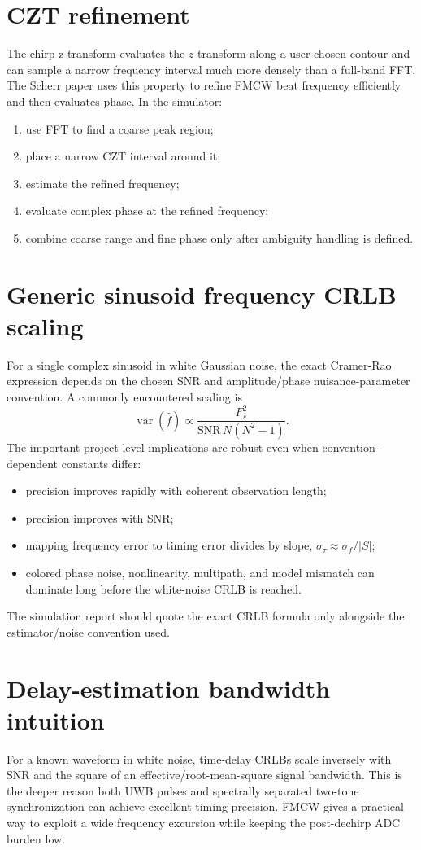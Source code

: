 \documentclass[11pt]{article}
\begin{document}
\section{CZT refinement}
The chirp-z transform evaluates the $z$-transform along a user-chosen contour and can sample a narrow frequency interval much more densely than a full-band FFT. The Scherr paper uses this property to refine FMCW beat frequency efficiently and then evaluates phase. In the simulator:
\begin{enumerate}
\item use FFT to find a coarse peak region;
\item place a narrow CZT interval around it;
\item estimate the refined frequency;
\item evaluate complex phase at the refined frequency;
\item combine coarse range and fine phase only after ambiguity handling is defined.
\end{enumerate}

\section{Generic sinusoid frequency CRLB scaling}
For a single complex sinusoid in white Gaussian noise, the exact Cramer-Rao expression depends on the chosen SNR and amplitude/phase nuisance-parameter convention. A commonly encountered scaling is
\[
\operatorname{var}(\hat f)\propto \frac{F_s^2}{\mathrm{SNR}\,N(N^2-1)}.
\]
The important project-level implications are robust even when convention-dependent constants differ:
\begin{itemize}
\item precision improves rapidly with coherent observation length;
\item precision improves with SNR;
\item mapping frequency error to timing error divides by slope, $\sigma_\tau\approx \sigma_f/|S|$;
\item colored phase noise, nonlinearity, multipath, and model mismatch can dominate long before the white-noise CRLB is reached.
\end{itemize}
The simulation report should quote the exact CRLB formula only alongside the estimator/noise convention used.

\section{Delay-estimation bandwidth intuition}
For a known waveform in white noise, time-delay CRLBs scale inversely with SNR and the square of an effective/root-mean-square signal bandwidth. This is the deeper reason both UWB pulses and spectrally separated two-tone synchronization can achieve excellent timing precision. FMCW gives a practical way to exploit a wide frequency excursion while keeping the post-dechirp ADC burden low.
\end{document}

